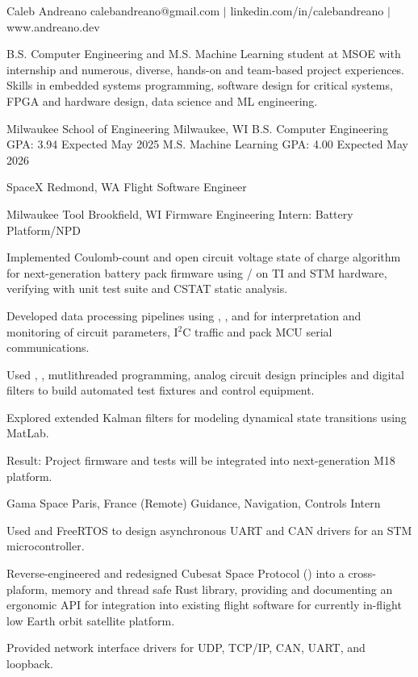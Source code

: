 \documentclass[11pt]{article}
\begin{document}

\namestuff 
{Caleb Andreano}
{calebandreano@gmail.com $|$ linkedin.com/in/calebandreano $|$ www.andreano.dev}

\rootstart{}
B.S. Computer Engineering and M.S. Machine Learning student at MSOE with internship and numerous, diverse, hands-on and 
team-based project experiences. 
Skills in embedded systems programming, software design for critical systems, FPGA and hardware design, data science and ML engineering.

\rootend


\sectiongpa
{Milwaukee School of Engineering} {Milwaukee, WI}
{B.S. Computer Engineering} {GPA: 3.94} {Expected May 2025}
{M.S. Machine Learning} {GPA: 4.00} {Expected May 2026}

\rootend


\sectionloc
{SpaceX} {Redmond, WA}
{Flight Software Engineer} {}
{}

\sectionloc
{Milwaukee Tool} {Brookfield, WI}
{Firmware Engineering Intern: Battery Platform/NPD} {}
{\begin{circlist}
	\item Implemented Coulomb-count and open circuit voltage state of charge algorithm for next-generation battery pack firmware using / on TI and STM hardware, verifying with unit test suite and CSTAT static analysis.
	\item Developed data processing pipelines using , ,  and  for interpretation and monitoring of circuit parameters, I$^2$C traffic and pack MCU serial communications.
	\item Used , , mutlithreaded programming, analog circuit design principles and digital filters to build automated test fixtures and control equipment.
	\item Explored extended Kalman filters for modeling dynamical state transitions using MatLab.
	\item Result: Project firmware and tests will be integrated into next-generation M18 platform.
\end{circlist}}

\sectionloc
{Gama Space} {Paris, France (Remote)}
{Guidance, Navigation, Controls Intern} {}
{\begin{circlist}
	\item Used  and FreeRTOS to design asynchronous UART and CAN drivers for an STM microcontroller.
	\item Reverse-engineered and redesigned Cubesat Space Protocol () into a cross-plaform, memory and thread safe Rust library, 
	      providing and documenting an ergonomic API for integration into existing flight software for currently in-flight low Earth orbit satellite platform.
	\item Provided network interface drivers for UDP, TCP/IP, CAN, UART, and loopback. 
\end{circlist}}
\end{document}
